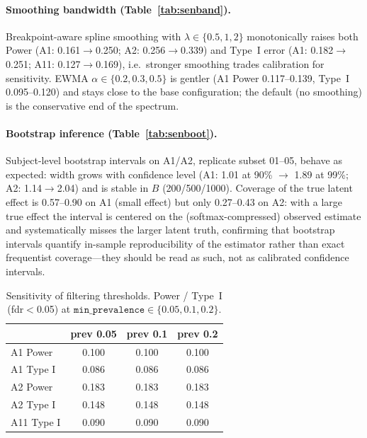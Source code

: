 \documentclass[11pt]{article}
\begin{document}
\paragraph{Smoothing bandwidth (Table~\ref{tab:senband}).}
Breakpoint-aware spline smoothing with $\lambda\in\{0.5,1,2\}$ monotonically raises both Power
(A1: 0.161$\to$0.250; A2: 0.256$\to$0.339) and Type~I error (A1: 0.182$\to$0.251; A11:
0.127$\to$0.169), i.e.\ stronger smoothing trades calibration for sensitivity. EWMA
$\alpha\in\{0.2,0.3,0.5\}$ is gentler (A1 Power 0.117--0.139, Type~I 0.095--0.120) and stays close
to the base configuration; the default (no smoothing) is the conservative end of the spectrum.

\paragraph{Bootstrap inference (Table~\ref{tab:senboot}).}
Subject-level bootstrap intervals on A1/A2, replicate subset 01--05, behave as expected: width grows
with confidence level (A1: 1.01 at 90\% $\to$ 1.89 at 99\%; A2: 1.14$\to$2.04) and is stable in
$B$ (200/500/1000). Coverage of the true latent effect is 0.57--0.90 on A1 (small effect) but only
0.27--0.43 on A2: with a large true effect the interval is centered on the (softmax-compressed)
observed estimate and systematically misses the larger latent truth, confirming that bootstrap
intervals quantify in-sample reproducibility of the estimator rather than exact frequentist
coverage---they should be read as such, not as calibrated confidence intervals.

\begin{table}[t]
\centering
\caption{Sensitivity of filtering thresholds. Power / Type~I (fdr$<$0.05) at
$\texttt{min\_prevalence}\in\{0.05,0.1,0.2\}$.}
\label{tab:senfilter}
\small
\begin{tabular}{lccc}
\toprule
 & prev 0.05 & prev 0.1 & prev 0.2 \\
\midrule
A1 Power   & 0.100 & 0.100 & 0.100 \\
A1 Type I  & 0.086 & 0.086 & 0.086 \\
A2 Power   & 0.183 & 0.183 & 0.183 \\
A2 Type I  & 0.148 & 0.148 & 0.148 \\
A11 Type I & 0.090 & 0.090 & 0.090 \\
\bottomrule
\end{tabular}
\end{table}
\end{document}
